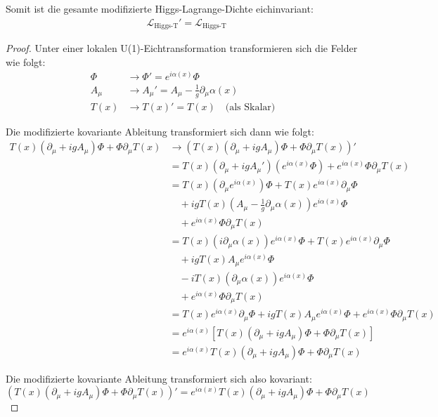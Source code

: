 \documentclass{article}
\theoremstyle{definition}
\theoremstyle{remark}
\newcommand{\Tfield}{T(x)} %
\newcommand{\DhiggsTdef}{\Tfield (\partial_\mu + igA_\mu)\Phi + \Phi \partial_\mu \Tfield}
\begin{document}
Somit ist die gesamte modifizierte Higgs-Lagrange-Dichte eichinvariant:
\begin{align}
	&\mathcal{L}_{\text{Higgs-T}}' = \mathcal{L}_{\text{Higgs-T}}
\end{align}
\begin{proof}
	Unter einer lokalen U(1)-Eichtransformation transformieren sich die Felder wie folgt:
	\begin{align}
		\Phi &\rightarrow \Phi' = e^{i\alpha(x)}\Phi \\
		A_\mu &\rightarrow A_\mu' = A_\mu - \frac{1}{g}\partial_\mu \alpha(x) \\
		\Tfield &\rightarrow \Tfield' = \Tfield \quad \text{(als Skalar)}
	\end{align}
	
	Die modifizierte kovariante Ableitung transformiert sich dann wie folgt:
	\begin{align}
		\DhiggsTdef &\rightarrow (\DhiggsTdef)' \\
		&= \Tfield (\partial_\mu + igA_\mu')(e^{i\alpha(x)}\Phi) + e^{i\alpha(x)}\Phi \partial_\mu \Tfield \\
		&= \Tfield (\partial_\mu e^{i\alpha(x)})\Phi + \Tfield e^{i\alpha(x)}\partial_\mu\Phi \nonumber \\
		&\quad + ig\Tfield (A_\mu - \frac{1}{g}\partial_\mu \alpha(x))e^{i\alpha(x)}\Phi \nonumber \\
		&\quad + e^{i\alpha(x)}\Phi \partial_\mu \Tfield \\
		&= \Tfield (i\partial_\mu\alpha(x))e^{i\alpha(x)}\Phi + \Tfield e^{i\alpha(x)}\partial_\mu\Phi \nonumber \\
		&\quad + ig\Tfield A_\mu e^{i\alpha(x)}\Phi \nonumber \\
		&\quad - i\Tfield(\partial_\mu \alpha(x))e^{i\alpha(x)}\Phi \nonumber \\
		&\quad + e^{i\alpha(x)}\Phi \partial_\mu \Tfield \\
		&= \Tfield e^{i\alpha(x)}\partial_\mu\Phi + ig\Tfield A_\mu e^{i\alpha(x)}\Phi + e^{i\alpha(x)}\Phi \partial_\mu \Tfield \\
		&= e^{i\alpha(x)}[\Tfield(\partial_\mu + igA_\mu)\Phi + \Phi\partial_\mu\Tfield] \\
		&= e^{i\alpha(x)}\DhiggsTdef
	\end{align}
	
	Die modifizierte kovariante Ableitung transformiert sich also kovariant:
	\begin{equation}
		(\DhiggsTdef)' = e^{i\alpha(x)}\DhiggsTdef
	\end{equation}
\end{proof}
		
\end{document}
